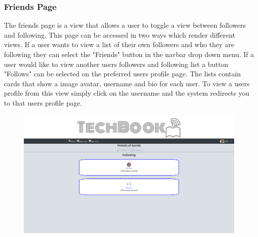 \subsubsection{Friends Page} 
The friends page is a view that allows a user to toggle a view between followers and following. This page can be accessed in two ways which render different views. If a user wants to view a list of their own followers and who they are following they can select the "Friends" button in the navbar drop down menu. If a user would like to view another users followers and following list a button "Follows" can be selected on the preferred users profile page. The lists contain cards that show a image avatar, username and bio for each user. To view a users profile from this view simply click on the username and the system redirects you to that users profile page.
\begin{figure}[H]
\centering
\begin{minipage}{.75\textwidth}
  \centering
  \includegraphics[width=.9\linewidth]{img/ui/followPC.PNG}
  \label{fig:followPC}
\end{minipage}%
\begin{minipage}{.25\textwidth}
  \centering

\end{minipage}
\end{figure}
